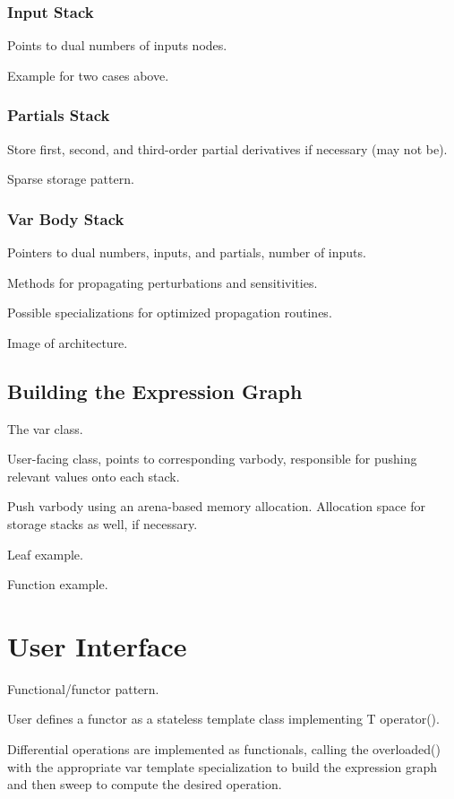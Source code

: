 \subsubsection{Input Stack}

Points to dual numbers of inputs nodes.

Example for two cases above.

\subsubsection{Partials Stack}

Store first, second, and third-order partial derivatives if
necessary (may not be).

Sparse storage pattern.

\subsubsection{Var Body Stack}

Pointers to dual numbers, inputs, and partials, number of inputs.

Methods for propagating perturbations and sensitivities.

Possible specializations for optimized propagation routines.

Image of architecture.

\subsection{Building the Expression Graph}

The var class.

User-facing class, points to corresponding varbody,
responsible for pushing relevant values onto each stack.

Push varbody using an arena-based memory allocation.
Allocation space for storage stacks as well, if necessary.

Leaf example.

Function example.

\section{User Interface}

Functional/functor pattern.

User defines a functor as a stateless template class implementing T operator().

Differential operations are implemented as functionals,
calling the overloaded() with the appropriate var template specialization
to build the expression graph and then sweep to compute the desired
operation.
